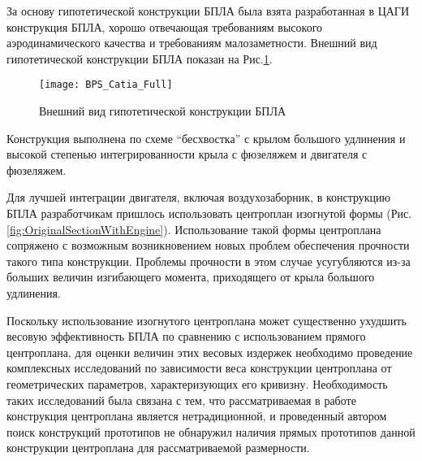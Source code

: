 





За основу гипотетической конструкции БПЛА была взята разработанная в ЦАГИ конструкция БПЛА, хорошо отвечающая требованиям высокого аэродинамического качества и требованиям малозаметности. Внешний вид гипотетической конструкции БПЛА показан на Рис.\ref{fig:BPLA_TSAGI}.
 

  
  



\begin{figure}[ht]
\centering
\texttt{[image: BPS\_Catia\_Full]}
\caption{Внешний вид гипотетической конструкции БПЛА}
\label{fig:BPLA_TSAGI}
\end{figure}

Конструкция выполнена по схеме ``бесхвостка'' с крылом большого удлинения и высокой степенью интегрированности крыла с фюзеляжем и двигателя с фюзеляжем. 

Для лучшей интеграции двигателя, включая воздухозаборник, в конструкцию БПЛА разработчикам пришлось использовать центроплан изогнутой формы (Рис.\ref{fig:OriginalSectionWithEngine}). Использование такой формы центроплана сопряжено с возможным возникновением новых проблем обеспечения прочности такого типа конструкции. Проблемы прочности в этом случае усугубляются из-за больших величин изгибающего момента, приходящего от крыла большого удлинения. 

Поскольку использование изогнутого центроплана может существенно ухудшить весовую эффективность БПЛА по сравнению с использованием прямого центроплана, для оценки величин этих весовых издержек необходимо проведение комплексных исследований по зависимости веса конструкции центроплана от геометрических параметров, характеризующих его кривизну. 
Необходимость таких исследований была связана с тем, что рассматриваемая в работе конструкция центроплана является нетрадиционной, и проведенный автором поиск конструкций прототипов не обнаружил наличия прямых прототипов данной конструкции центроплана для рассматриваемой размерности.

